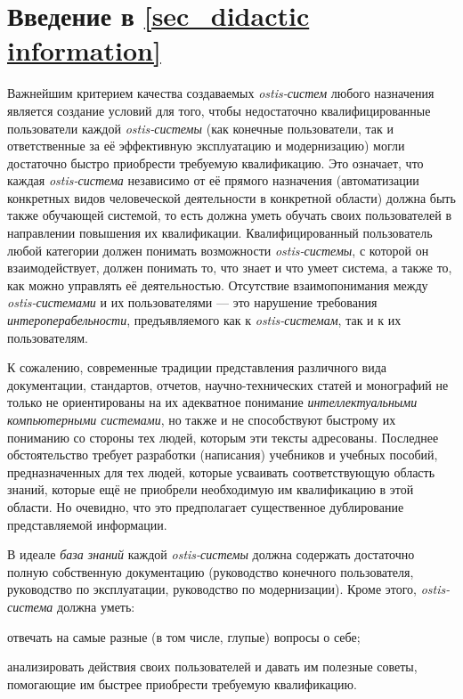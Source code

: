 \section*{Введение в \ref{sec_didactic information}}
Важнейшим критерием качества создаваемых \textit{ostis-систем} любого назначения является создание условий для того, чтобы недостаточно квалифицированные пользователи каждой \textit{ostis-системы} (как конечные пользователи, так и ответственные за её эффективную эксплуатацию и модернизацию) могли достаточно быстро   приобрести требуемую квалификацию. Это означает, что каждая \textit{ostis-система} независимо от её прямого назначения (автоматизации конкретных видов человеческой деятельности в конкретной области) должна быть также обучающей системой, то есть должна уметь обучать своих пользователей в направлении повышения их квалификации. Квалифицированный пользователь любой категории должен понимать возможности \textit{ostis-системы}, с которой он взаимодействует, должен понимать то, что знает и что умеет система, а также то, как можно управлять её деятельностью. Отсутствие взаимопонимания между \textit{ostis-системами} и их пользователями --- это нарушение требования \textit{интероперабельности}, предъявляемого как к \textit{ostis-системам}, так и к их пользователям.

К сожалению, современные традиции представления различного вида документации, стандартов, отчетов, научно-технических статей и монографий не только не ориентированы на их адекватное понимание \textit{интеллектуальными компьютерными системами}, но также и не способствуют быстрому их пониманию со стороны тех людей, которым эти тексты адресованы. Последнее обстоятельство требует разработки (написания) учебников и учебных пособий,  предназначенных для тех людей, которые  усваивать соответствующую область знаний, которые ещё не приобрели необходимую им квалификацию в этой области. Но очевидно, что это предполагает существенное дублирование представляемой информации.

В идеале \textit{база знаний} каждой \textit{ostis-системы} должна содержать достаточно полную собственную документацию (руководство конечного пользователя, руководство по эксплуатации, руководство по модернизации). Кроме этого, \textit{ostis-система} должна уметь:
\begin{textitemize}
	\item отвечать на самые разные (в том числе, глупые) вопросы о себе;
	\item анализировать действия своих пользователей и давать им полезные советы, помогающие им быстрее приобрести требуемую квалификацию.
\end{textitemize}

